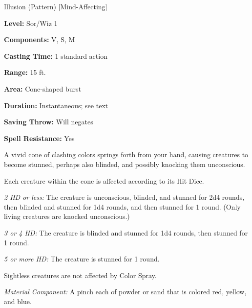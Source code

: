 
Illusion (Pattern) [Mind-Affecting]

\textbf{Level:} Sor/Wiz 1

\textbf{Components:} V, S, M

\textbf{Casting Time:} 1 standard action

\textbf{Range:} 15 ft.

\textbf{Area:} Cone-shaped burst

\textbf{Duration:} Instantaneous; see text

\textbf{Saving Throw:} Will negates

\textbf{Spell Resistance:} Yes

A vivid cone of clashing colors springs forth from your hand, causing creatures 
to become stunned, perhaps also blinded, and possibly knocking them unconscious.

Each creature within the cone is affected according to its Hit Dice.

\textit{2 HD or less:} The creature is unconscious, blinded, and stunned for 2d4 
rounds, then blinded and stunned for 1d4 rounds, and then stunned for 1 round. 
(Only living creatures are knocked unconscious.)

\textit{3 or 4 HD:} The creature is blinded and stunned for 1d4 rounds, then stunned 
for 1 round.

\textit{5 or more HD:} The creature is stunned for 1 round.

Sightless creatures are not affected by Color Spray.

\textit{Material Component:} A pinch each of powder or sand that is colored red, 
yellow, and blue.

